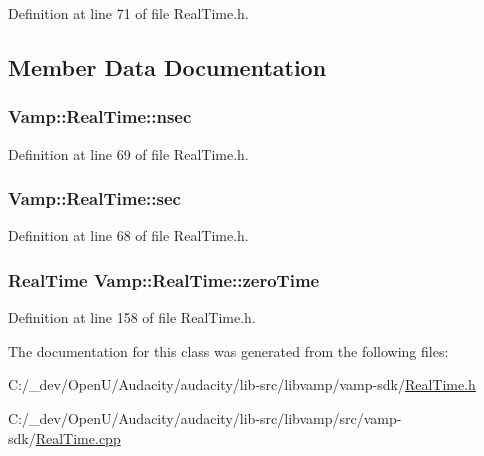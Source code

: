 Definition at line 71 of file Real\+Time.\+h.



\subsection{Member Data Documentation}
\subsubsection[{\texorpdfstring{nsec}{nsec}}]{ Vamp\+::\+Real\+Time\+::nsec}\hypertarget{struct_vamp_1_1_real_time_a2078835bef7bb92514a65b6051cfc6c8}{}\label{struct_vamp_1_1_real_time_a2078835bef7bb92514a65b6051cfc6c8}


Definition at line 69 of file Real\+Time.\+h.

\subsubsection[{\texorpdfstring{sec}{sec}}]{ Vamp\+::\+Real\+Time\+::sec}\hypertarget{struct_vamp_1_1_real_time_ab4d81983384a9f57ce064e6c343f2267}{}\label{struct_vamp_1_1_real_time_ab4d81983384a9f57ce064e6c343f2267}


Definition at line 68 of file Real\+Time.\+h.

\subsubsection[{\texorpdfstring{zero\+Time}{zeroTime}}]{ {\bf Real\+Time} Vamp\+::\+Real\+Time\+::zero\+Time\hspace{0.3cm}{\ttfamily [static]}}\hypertarget{struct_vamp_1_1_real_time_abe453371597710148b0fd19bb452f8a9}{}\label{struct_vamp_1_1_real_time_abe453371597710148b0fd19bb452f8a9}


Definition at line 158 of file Real\+Time.\+h.



The documentation for this class was generated from the following files\+:\begin{DoxyCompactItemize}
\item 
C\+:/\+\_\+dev/\+Open\+U/\+Audacity/audacity/lib-\/src/libvamp/vamp-\/sdk/\hyperlink{vamp-sdk_2_real_time_8h}{Real\+Time.\+h}\item 
C\+:/\+\_\+dev/\+Open\+U/\+Audacity/audacity/lib-\/src/libvamp/src/vamp-\/sdk/\hyperlink{vamp-sdk_2_real_time_8cpp}{Real\+Time.\+cpp}\end{DoxyCompactItemize}

